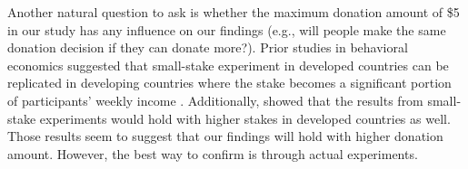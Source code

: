 \begin{description} [leftmargin=\parindent,topsep=0pt,partopsep=3pt,parsep=0pt,itemsep=3pt, listparindent=\parindent]
    \item[Donation Amount:] Another natural question to ask is whether the maximum donation amount of  \$5  in our study has any influence on our findings (e.g., will people make the same donation decision if they can donate more?).  Prior studies in behavioral economics suggested that small-stake experiment in developed countries can be replicated in developing countries where the stake becomes a significant portion of participants' weekly income \cite{binswanger1980attitudes,binswanger1981attitudes,kachelmeier1992examining}. Additionally, \textcite{post2008deal} showed that the results from small-stake experiments would hold with higher stakes in developed countries as well. Those results seem to suggest that our findings will hold with higher donation amount. However, the best way to confirm is through actual experiments. 

\end{description}
